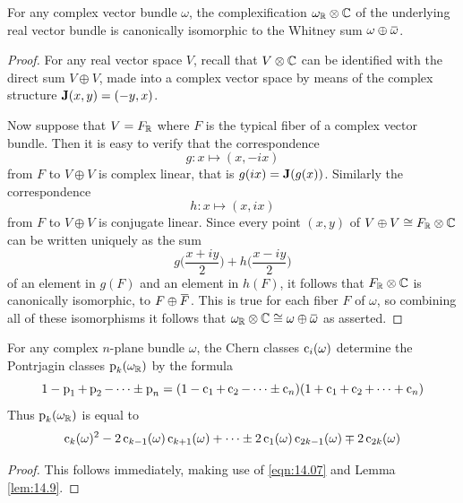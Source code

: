 \documentclass[../main]{subfiles}
\begin{document}
\begin{lemma}
\label{lem:15.04}
For any complex vector bundle $\omega$, the complexification $\omega_{\mathbb R} \otimes \mathbb C$ of the underlying real vector bundle is canonically isomorphic to the Whitney sum $\omega \oplus \xoverline{\omega}$.
\end{lemma}
\begin{proof}
For any real vector space $V$, recall that $V \otimes \mathbb C$ can be identified with the direct sum $V \oplus V$, made into a complex vector space by means of the complex structure $\mathbf{J}(x,y) = (-y,x)$. 

Now suppose that $V = F_\mathbb R$ where $F$ is the typical fiber of a complex vector bundle. Then it is easy to verify that the correspondence \[g:x \mapsto (x,-ix)\] from $F$ to $V \oplus V$ is complex linear, that is $g(ix) = \mathbf{J}(g(x))$. Similarly the correspondence \[h:x \mapsto (x,ix)\] from $F$ to $V \oplus V$ is conjugate linear. Since every point $(x,y)$ of $V \oplus V \cong F_\mathbb R \otimes \mathbb C$ can be written uniquely as the sum \[g\bigg(\frac{x+iy}{2}\bigg) + h\bigg(\frac{x-iy}{2}\bigg)\] of an element in $g(F)$ and an element in $h(F)$, it follows that $F_\mathbb R \otimes \mathbb C$ is canonically isomorphic,  to $F \oplus \xoverline{F}$. This is true for each fiber $F$ of $\omega$, so combining all of these isomorphisms it follows that $\omega_\bR \otimes \bC \cong \omega \oplus \xoverline{\omega}$ as asserted.
\end{proof}

\begin{corollary}
\label{cor:15.05}
For any complex $n$-plane bundle $\omega$, the Chern classes $\operatorname{c}_i(\omega)$ determine the Pontrjagin classes $\operatorname{p}_k(\omega_\mathbb R)$ by the formula \[1-\operatorname{p}_1+\operatorname{p}_2 - \cdots \pm \operatorname{p}_n = (1-\operatorname{c}_1+\operatorname{c}_2 -\cdots \pm \operatorname{c}_n)(1+\operatorname{c}_1 +\operatorname{c}_2 + \cdots + \operatorname{c}_n)\] Thus $\operatorname{p}_k(\omega_\mathbb R)$ is equal to \[ \operatorname{c}_k(\omega)^2 - 2\operatorname{c}_{k-1}(\omega)\operatorname{c}_{k+1}(\omega) + \cdots \pm 2\operatorname{c}_1(\omega)\operatorname{c}_{2k-1}(\omega) \mp 2\operatorname{c}_{2k}(\omega)\]
\end{corollary}
\begin{proof}
This follows immediately, making use of \ref{eqn:14.07} and Lemma \ref{lem:14.9}.
\end{proof}
\end{document}
